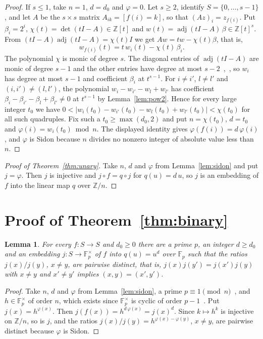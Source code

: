 \documentclass[11pt]{article}
\newtheorem{lemma}{Lemma}
\theoremstyle{definition}
\newcommand{\Z}{\mathbb{Z}}
\newcommand{\F}{\mathbb{F}}
\begin{document}
\begin{proof}
If $s\le 1$, take $n=1$, $d=d_0$ and $\varphi=0$. Let $s\ge 2$, identify $S=\{0,\dots,s-1\}$,
and let $A$ be the $s\times s$ matrix $A_{ik}=[f(i)=k]$, so that $(Az)_i=z_{f(i)}$. Put
$\beta_i=2^i$, $\chi(t)=\det(tI-A)\in\Z[t]$ and $w(t)=\operatorname{adj}(tI-A)\,\beta\in\Z[t]^s$.
From $(tI-A)\operatorname{adj}(tI-A)=\chi(t)I$ we get $Aw=tw-\chi(t)\beta$, that is,
\[
  w_{f(i)}(t)=t\,w_i(t)-\chi(t)\,\beta_i .
\]
The polynomial $\chi$ is monic of degree $s$. The diagonal entries of
$\operatorname{adj}(tI-A)$ are monic of degree $s-1$ and the other entries have degree at most
$s-2$~\cite[Lemma~2.7]{finlin},~\cite{horn}, so $w_i$ has degree at most $s-1$ and coefficient $\beta_i$ at $t^{s-1}$. For $i\ne i'$,
$l\ne l'$ and $(i,i')\ne(l,l')$, the polynomial $w_i-w_{i'}-w_l+w_{l'}$ has coefficient
$\beta_i-\beta_{i'}-\beta_l+\beta_{l'}\ne 0$ at $t^{s-1}$ by Lemma~\ref{lem:pow2}. Hence for
every large integer $t_0$ we have $0<|w_i(t_0)-w_{i'}(t_0)-w_l(t_0)+w_{l'}(t_0)|<\chi(t_0)$ for
all such quadruples. Fix such a $t_0\ge\max(d_0,2)$ and put $n=\chi(t_0)$, $d=t_0$ and
$\varphi(i)=w_i(t_0)\bmod n$. The displayed identity gives $\varphi(f(i))=d\,\varphi(i)$, and
$\varphi$ is Sidon because $n$ divides no nonzero integer of absolute value less than $n$.
\end{proof}

\begin{proof}[Proof of Theorem~\ref{thm:unary}]
Take $n$, $d$ and $\varphi$ from Lemma~\ref{lem:sidon} and put $j=\varphi$. Then $j$ is
injective and $j\circ f=q\circ j$ for $q(u)=d\,u$, so $j$ is an embedding of $f$ into the linear
map $q$ over $\Z/n$.
\end{proof}

\section{Proof of Theorem~\ref{thm:binary}}

\begin{lemma}\label{lem:power}
For every $f\colon S\to S$ and $d_0\ge 0$ there are a prime $p$, an integer $d\ge d_0$ and an
embedding $j\colon S\to\F_p^\times$ of $f$ into $q(u)=u^d$ over $\F_p$ such that the ratios
$j(x)/j(y)$, $x\ne y$, are pairwise distinct, that is, $j(x)j(y')=j(x')j(y)$ with $x\ne y$ and
$x'\ne y'$ implies $(x,y)=(x',y')$.
\end{lemma}

\begin{proof}
Take $n$, $d$ and $\varphi$ from Lemma~\ref{lem:sidon}, a prime $p\equiv 1\pmod n$~\cite{borevich},
and $h\in\F_p^\times$ of order $n$, which exists since $\F_p^\times$ is cyclic of order
$p-1$~\cite{lang}. Put $j(x)=h^{\varphi(x)}$. Then
$j(f(x))=h^{d\,\varphi(x)}=j(x)^d$. Since $k\mapsto h^k$ is injective on $\Z/n$, so is
$j$, and the ratios $j(x)/j(y)=h^{\varphi(x)-\varphi(y)}$, $x\ne y$, are pairwise
distinct because $\varphi$ is Sidon.
\end{proof}
\end{document}
